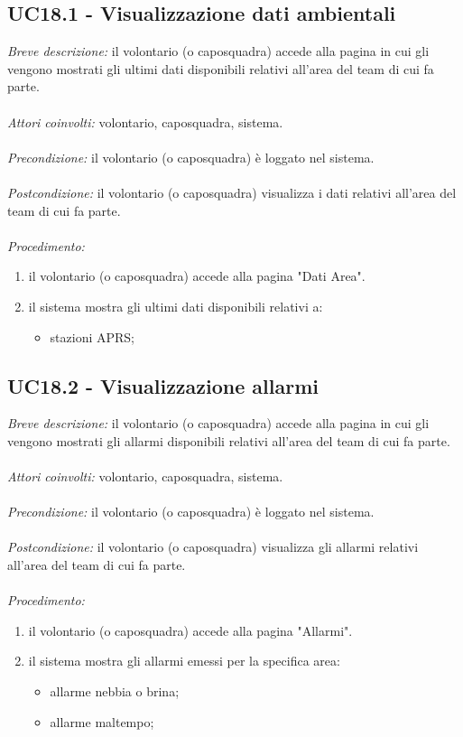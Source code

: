 \subsection{UC18.1 - Visualizzazione dati ambientali}
\textit{Breve descrizione:} il volontario (o caposquadra) accede alla pagina in cui gli vengono mostrati gli ultimi dati disponibili relativi all'area del team di cui fa parte. 
\\
\\
\textit{Attori coinvolti:} volontario, caposquadra, sistema.
\\
\\
\textit{Precondizione:} il volontario (o caposquadra) è loggato nel sistema.
\\
\\
\textit{Postcondizione:} il volontario (o caposquadra) visualizza i dati relativi all'area del team di cui fa parte.
\\
\\
\textit{Procedimento:}
\begin{enumerate}
	\item il volontario (o caposquadra) accede alla pagina "Dati Area".
	\item il sistema mostra gli ultimi dati disponibili relativi a:
	\begin{itemize}
		\item stazioni APRS;
	\end{itemize}
\end{enumerate}

\subsection{UC18.2 - Visualizzazione allarmi}
\textit{Breve descrizione:} il volontario (o caposquadra) accede alla pagina in cui gli vengono mostrati gli allarmi disponibili relativi all'area del team di cui fa parte. 
\\
\\
\textit{Attori coinvolti:} volontario, caposquadra, sistema.
\\
\\
\textit{Precondizione:} il volontario (o caposquadra) è loggato nel sistema.
\\
\\
\textit{Postcondizione:} il volontario (o caposquadra) visualizza gli allarmi relativi all'area del team di cui fa parte.
\\
\\
\textit{Procedimento:}
\begin{enumerate}
	\item il volontario (o caposquadra) accede alla pagina "Allarmi".
	\item il sistema mostra gli allarmi emessi per la specifica area:
	\begin{itemize}
		\item allarme nebbia o brina;
		\item allarme maltempo;
	\end{itemize}
\end{enumerate}

